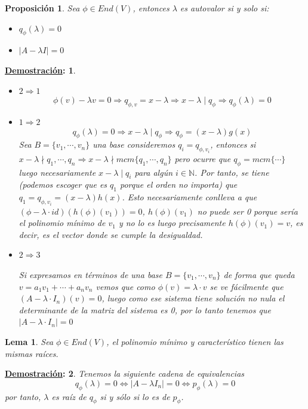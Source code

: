 \documentclass[10pt,a4paper,openright]{book}
\theoremstyle{break}
\newtheorem*{lema}{Lema}
\newtheorem*{prop}{Proposición}
\newtheorem*{demo}{\underline{Demostración}:}
\begin{document}
\begin{prop}
Sea $\phi\in End(V)$, entonces $\lambda$ es autovalor si y solo si:
\begin{itemize}
\item $q_\phi(\lambda)=0$
\item $\vert A -\lambda I\vert = 0$
\end{itemize}
\end{prop}
\begin{demo}
\begin{itemize}
\item $2\Rightarrow 1$
$$\phi(v)-\lambda v =0 \Rightarrow q_{\phi,v}=x-\lambda \Rightarrow x-\lambda\mid q_\phi\Rightarrow q_\phi(\lambda)=0$$

\item $1\Rightarrow 2$
$$q_\phi(\lambda)=0\Rightarrow x-\lambda\mid q_\phi\Rightarrow q_\phi = (x-\lambda)g(x)$$
Sea $B=\{v_1, \cdots, v_n\}$ una base consideremos $q_i=q_{\phi,v_i}$, entonces si $x-\lambda \nmid q_1, \cdots, q_n \Rightarrow x-\lambda\nmid mcm\{q_1, \cdots, q_n\}$ pero ocurre que $q_\phi = mcm \{\cdots\}$ luego necesariamente $x-\lambda \mid q_i$ para algún $i \in \mathbb N$. Por tanto, se tiene (podemos escoger que es $q_1$ porque el orden no importa) que $q_1=q_{\phi,v_i} = (x-\lambda)h(x)$. Esto necesariamente conlleva a que $(\phi-\lambda\cdot id)(h(\phi)(v_1))=0$, $h(\phi)(v_1)$ no puede ser 0 porque sería el polinomio mínimo de $v_1$ y no lo es luego precisamente $h(\phi)(v_1)=v$, es decir, es el vector donde se cumple la desigualdad.   

\item $2\Rightarrow 3$

Si expresamos en términos de una base $B=\{v_1,\cdots, v_n\}$ de forma que queda $v=a_1v_1+\cdots+a_nv_n$ vemos que como $\phi(v)=\lambda\cdot v$ se ve fácilmente que $(A-\lambda\cdot I_n)(v)=0$, luego como ese sistema tiene solución no nula el determinante de la matriz del sistema es 0, por lo tanto tenemos que $|A-\lambda \cdot I_n|=0$
\end{itemize}
\end{demo}


\begin{lema}
Sea $\phi \in End(V)$, el polinomio mínimo y característico tienen las mismas raíces.
\end{lema}
\begin{demo}
Tenemos la siguiente cadena de equivalencias
$$q_\phi(\lambda)=0\Leftrightarrow|A-\lambda I_n|=0\Leftrightarrow p_\phi(\lambda)=0$$
por tanto, $\lambda$ es raíz de $q_\phi$ si y sólo si lo es de $p_\phi$.
\end{demo}
\end{document}
